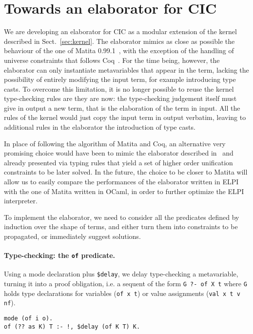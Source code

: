 \documentclass{easychair}
\begin{document}

\section{Towards an elaborator for CIC}\label{sec:cicelaborator}
We are developing an elaborator for CIC as a modular extension of the kernel described in Sect.~\ref{sec:kernel}. The elaborator mimics as close as possible the behaviour of the one of Matita 0.99.1~\cite{bidir}, with the exception of the handling of universe constraints that follows Coq~\cite{algebraic}. For the time being, however, the elaborator can only instantiate metavariables that appear in the term, lacking the possibility of entirely modifying the input term, for example introducing type casts. To overcome this limitation, it is no longer possible to reuse the kernel type-checking rules are they are now: the type-checking judgement itself must give in output a new term, that is the elaboration of the term in input. All the rules of the kernel would just copy the input term in output verbatim, leaving to additional rules in the elaborator the introduction of type casts.

In place of following the algorithm of Matita and Coq, an alternative very promising choice would have been to mimic the elaborator described in~\cite{abel} and already presented via typing rules that yield a set of higher order unification constraints to be later solved. In the future, the choice to be closer to Matita will allow us to easily compare the performances of the elaborator written in ELPI with the one of Matita written in OCaml, in order to further optimize the ELPI interpreter.

To implement the elaborator, we need to consider all the predicates defined by induction over the shape of terms, and either turn them into constraints to be propagated, or immediately suggest solutions.

\paragraph{Type-checking: the \texttt{of} predicate.}
Using a mode declaration plus \verb+$delay+, we delay type-checking a
metavariable, turning it into a proof obligation, i.e. a sequent of the form
\verb+G ?- of X t+
where \verb+G+ holds type declarations for variables (\verb+of x t+) or value assignments (\verb+val x t v nf+).

\begin{Verbatim}
mode (of i o).
of (?? as K) T :- !, $delay (of K T) K.
\end{Verbatim}
\end{document}
